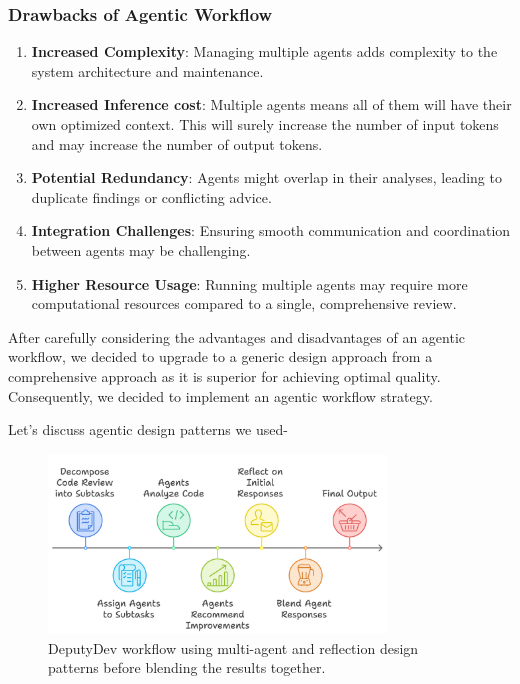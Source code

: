 \subsubsection{Drawbacks of Agentic Workflow}
\begin{enumerate}
    \item \textbf{Increased Complexity}: Managing multiple agents adds complexity to the system architecture and maintenance.
    \item \textbf{Increased Inference cost}: Multiple agents means all of them will have their own optimized context. This will surely increase the number of input tokens and may increase the number of output tokens.
    \item \textbf{Potential Redundancy}: Agents might overlap in their analyses, leading to duplicate findings or conflicting advice.
    \item \textbf{Integration Challenges}: Ensuring smooth communication and coordination between agents may be challenging.
    \item \textbf{Higher Resource Usage}: Running multiple agents may require more computational resources compared to a single, comprehensive review.
\end{enumerate}

After carefully considering the advantages and disadvantages of an agentic workflow, we decided to upgrade to a generic design approach from a comprehensive approach as it is superior for achieving optimal quality. Consequently, we decided to implement an agentic workflow strategy.

Let's discuss agentic design patterns we used-

\begin{figure}[htbp]
    \centering
    \includegraphics[width=0.8\textwidth]
    {Figures/workflow.png}
    \caption{DeputyDev workflow using multi-agent and reflection design patterns before blending the results together.}
    \label{fig:DeputyDev-workflow}
\end{figure}


